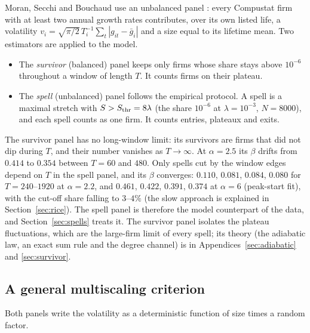 \documentclass[11pt]{article}
\newcommand{\Sthr}{S_{\rm thr}}
\begin{document}
Moran, Secchi and Bouchaud use an unbalanced panel \citep{moran2024}: every Compustat firm with at
least two annual growth rates contributes, over its own listed life, a volatility
$v_i=\sqrt{\pi/2}\,T_i^{-1}\sum_t|g_{it}-\bar g_i|$ and a size equal to its lifetime mean.  Two
estimators are applied to the model.
\begin{itemize}
  \item The \emph{survivor} (balanced) panel keeps only firms whose share stays above $10^{-6}$
        throughout a window of length $T$.  It counts firms on their plateau.
  \item The \emph{spell} (unbalanced) panel follows the empirical protocol.  A spell is a maximal
        stretch with $S>\Sthr=8\lambda$ (the share $10^{-6}$ at $\lambda=10^{-3}$, $N=8000$), and
        each spell counts as one firm.  It counts entries, plateaux and exits.
\end{itemize}
The survivor panel has no long-window limit: its survivors are firms that did not dip during
$T$, and their number vanishes as $T\to\infty$.  At $\alpha=2.5$ its $\beta$ drifts from $0.414$ to
$0.354$ between $T=60$ and $480$.  Only spells cut by the window edges depend on $T$ in the spell
panel, and its $\beta$ converges: $0.110$, $0.081$, $0.084$, $0.080$ for $T=240$--$1920$ at
$\alpha=2.2$, and $0.461$, $0.422$, $0.391$, $0.374$ at $\alpha=6$ (peak-start fit), with the cut-off
share falling to $3$--$4\%$ (the slow approach is explained in Section~\ref{sec:rice}).  The spell panel is
therefore the model counterpart of the data, and Section~\ref{sec:spells} treats it.  The survivor
panel isolates the plateau fluctuations, which are the large-firm limit of every spell; its
theory (the adiabatic law, an exact sum rule and the degree channel) is in
Appendices~\ref{sec:adiabatic} and \ref{sec:survivor}.

\subsection{A general multiscaling criterion}
\label{sec:criterion}

Both panels write the volatility as a deterministic function of size times a random factor.
\end{document}
